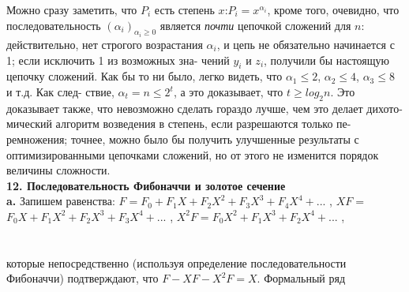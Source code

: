 \hspace*{15pt}Можно сразу заметить, что $P_i$ есть степень $x$:$ P_i=x^{\alpha_i}$, кроме того,\linebreak
очевидно, что последовательность $(\alpha_i)_{\alpha_i\geqslant 0}$ является \textit{почти} цепочкой\linebreak
сложений для $n$: действительно, нет строгого возрастания $\alpha_i$, и цепь\linebreak
не обязательно начинается с 1; если исключить 1 из возможных зна­-\linebreak
чений $y_i$ и $z_i$, получили бы настоящую цепочку сложений. Как бы то\linebreak
ни было, легко видеть, что $\alpha_1\leqslant2$, $\alpha_2\leqslant 4$, $\alpha_3\leqslant8$ и т.д. Как след­-\linebreak
ствие, $\alpha_t=n\leqslant2^t$, а это доказывает, что $t\geqslant log_2n$. Это доказывает\linebreak
также, что невозможно сделать гораздо лучше, чем это делает дихото­-\linebreak
мический алгоритм возведения в степень, если разрешаются только пе-\linebreak
ремножения; точнее, можно было бы получить улучшенные результаты\linebreak
с оптимизированными цепочками сложений, но от этого не изменится\linebreak
порядок величины сложности.\\

\noindent\textbf{12. Последовательность Фибоначчи и золотое сечение}\\

\hspace*{15pt}\textbf{a.} Запишем равенства:\newline
\hspace*{80pt}$F=F_0+F_1X+F_2X^2+F_3X^3+F_4X^4+...$ ,\newline
\hspace*{71pt}$XF=$\hspace{26pt}$F_0X+F_1X^2+F_2X^3+F_3X^4+...$ ,\newline
\hspace*{67pt}$X^2F=$\hspace{58pt}$F_0X^2+F_1X^3+F_2X^4+...$ ,\\\\\\
которые непосредственно (используя определение последовательности\linebreak
Фибоначчи) подтверждают, что $F-XF-X^2F=X$. Формальный ряд\linebreak
\newpage



